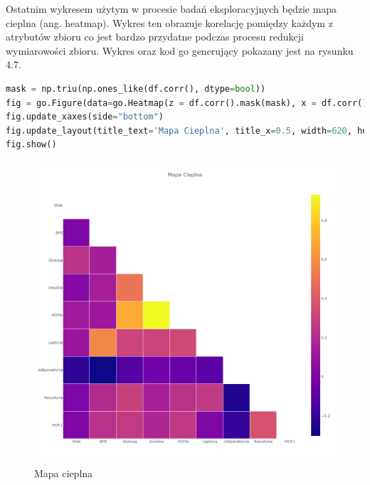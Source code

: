 \documentclass[a4paper,12pt,oneside]{book}
\begin{document}
Ostatnim wykresem użytym w procesie badań eksploracyjnych będzie mapa cieplna (ang. heatmap). Wykres ten obrazuje korelację pomiędzy każdym z atrybutów zbioru co jest bardzo przydatne podczas procesu redukcji wymiarowości zbioru. Wykres oraz kod go generujący pokazany jest na rysunku 4.7.


\begin{lstlisting}[language=Python, caption=Tworzenie mapy cieplnej]
mask = np.triu(np.ones_like(df.corr(), dtype=bool))
fig = go.Figure(data=go.Heatmap(z = df.corr().mask(mask), x = df.corr().columns, y = df.corr().columns, showscale=True, ygap=1, xgap=1))
fig.update_xaxes(side="bottom")
fig.update_layout(title_text='Mapa Cieplna', title_x=0.5, width=620, height=620, xaxis_showgrid=False, yaxis_showgrid=False, xaxis_zeroline=False, yaxis_zeroline=False, yaxis_autorange='reversed', template='plotly_white')
fig.show()
\end{lstlisting}

\begin{figure}[h]
\centering
\includegraphics[scale=0.3]{heatNOCODE.png}
\caption{Mapa cieplna}
\end{figure}
\end{document}
